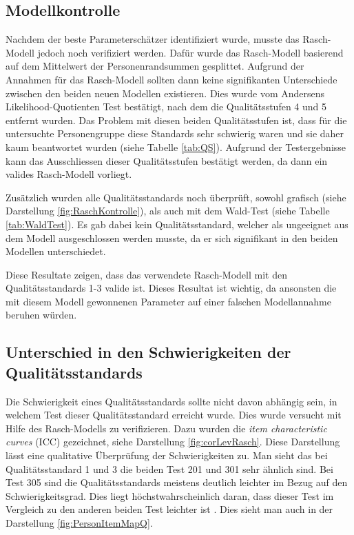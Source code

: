 \subsection{Modellkontrolle}

Nachdem der beste Parameterschätzer identifiziert wurde, musste das Rasch-Modell jedoch noch verifiziert werden. Dafür wurde das Rasch-Modell basierend auf dem Mittelwert der Personenrandsummen gesplittet. Aufgrund der Annahmen für das Rasch-Modell sollten dann keine signifikanten Unterschiede zwischen den beiden neuen Modellen existieren. Dies wurde vom Andersens Likelihood-Quotienten Test bestätigt, nach dem die Qualitätsstufen 4 und 5 entfernt wurden. Das Problem mit diesen beiden Qualitätsstufen ist, dass für die untersuchte Personengruppe diese Standards sehr schwierig waren und sie daher kaum beantwortet wurden (siehe Tabelle \ref{tab:QS}). Aufgrund der Testergebnisse kann das Ausschliessen dieser Qualitätsstufen bestätigt werden, da dann ein valides Rasch-Modell vorliegt.

Zusätzlich wurden alle Qualitätsstandards noch überprüft, sowohl grafisch (siehe Darstellung \ref{fig:RaschKontrolle}), als auch mit dem Wald-Test (siehe Tabelle \ref{tab:WaldTest}). Es gab dabei kein Qualitätsstandard, welcher als ungeeignet aus dem Modell ausgeschlossen werden musste, da er sich signifikant in den beiden Modellen unterschiedet.

Diese Resultate zeigen, dass das verwendete Rasch-Modell mit den Qualitätsstandards 1-3 valide ist. Dieses Resultat ist wichtig, da ansonsten die mit diesem Modell gewonnenen Parameter auf einer falschen Modellannahme beruhen würden.

\subsection{Unterschied in den Schwierigkeiten der Qualitätsstandards}

Die Schwierigkeit eines Qualitätsstandards sollte nicht davon abhängig sein, in welchem Test dieser Qualitätsstandard erreicht wurde. Dies wurde versucht mit Hilfe des Rasch-Modells zu verifizieren. Dazu wurden die \textit{item characteristic curves} (ICC) gezeichnet, siehe Darstellung \ref{fig:corLevRasch}. Diese Darstellung lässt eine qualitative Überprüfung der Schwierigkeiten zu. Man sieht das bei Qualitätsstandard 1 und 3 die beiden Test 201 und 301 sehr ähnlich sind. Bei Test 305 sind die Qualitätsstandards meistens deutlich leichter im Bezug auf den Schwierigkeitsgrad. Dies liegt höchstwahrscheinlich daran, dass dieser Test im Vergleich zu den anderen beiden Test leichter ist \citep{Sichau2015}. Dies sieht man auch in der Darstellung \ref{fig:PersonItemMapQ}.

